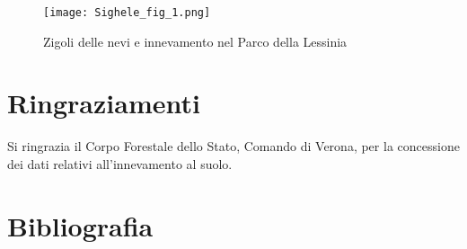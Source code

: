 \begin{figure}[!h]
\centering
\texttt{[image: Sighele\_fig\_1.png]}
\caption{Zigoli delle nevi e innevamento nel Parco della Lessinia}
\label{Sighele_fig_1}
\end{figure}

\section*{Ringraziamenti}
Si ringrazia il Corpo Forestale dello Stato, Comando di Verona, per la
concessione dei dati relativi all{\textquoteright}innevamento al suolo.

\section*{Bibliografia}

